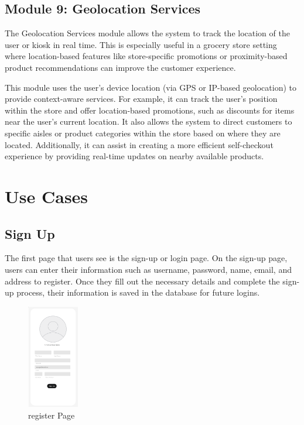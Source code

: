 \documentclass[conference]{IEEEtran}
\begin{document}
\subsection{Module 9: Geolocation Services} 
The Geolocation Services module allows the system to track the location of the user or kiosk in real time. This is especially useful in a grocery store setting where location-based features like store-specific promotions or proximity-based product recommendations can improve the customer experience.

This module uses the user’s device location (via GPS or IP-based geolocation) to provide context-aware services. For example, it can track the user’s position within the store and offer location-based promotions, such as discounts for items near the user’s current location. It also allows the system to direct customers to specific aisles or product categories within the store based on where they are located. Additionally, it can assist in creating a more efficient self-checkout experience by providing real-time updates on nearby available products.


\section{Use Cases}
\subsection{Sign Up}
The first page that users see is the sign-up or login page. On the sign-up page, users can enter their information such as username, password, name, email, and address to register. Once they fill out the necessary details and complete the sign-up process, their information is saved in the database for future logins.
\begin{figure}[H]  %
    \centering  %
    \includegraphics[width=0.2\textwidth]{register.PNG}  %
    \caption{register Page}  %
\end{figure}
\end{document}
